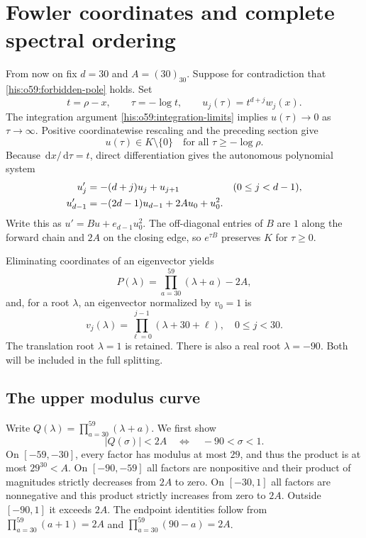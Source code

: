 \documentclass[11pt]{article}
\theoremstyle{remark}\newtheorem{remark}[theorem]{Remark}
\newcommand{\dd}{\,\mathrm d}
\numberwithin{equation}{section}
\begin{document}
\section{Fowler coordinates and complete spectral ordering}\label{his:o59:sec:fowler}
From now on fix $d=30$ and $A=(30)_{30}$. Suppose for contradiction
that \eqref{his:o59:forbidden-pole} holds. Set
\begin{equation}\label{his:o59:fowler}
t=\rho-x,\qquad \tau=-\log t,\qquad u_j(\tau)=t^{d+j}w_j(x).
\end{equation}
The integration argument \eqref{his:o59:integration-limits} implies
$u(\tau)\to0$ as $\tau\to\infty$. Positive coordinatewise rescaling
and the preceding section give
\begin{equation}\label{his:o59:orbit-properties}
u(\tau)\in K\setminus\{0\}\quad\text{for all }\tau\ge-\log\rho.
\end{equation}
Because $\dd x/\dd\tau=t$, direct differentiation gives the autonomous
polynomial system
\begin{align}
u_j'&=-(d+j)u_j+u_{j+1} &&(0\le j<d-1),\label{his:o59:fowler-system}\\
u_{d-1}'&=-(2d-1)u_{d-1}+2Au_0+u_0^2.\notag
\end{align}
Write this as $u'=Bu+e_{d-1}u_0^2$. The off-diagonal entries of $B$
are $1$ along the forward chain and $2A$ on the closing edge, so
$e^{\tau B}$ preserves $K$ for $\tau\ge0$.

Eliminating coordinates of an eigenvector yields
\begin{equation}\label{his:o59:characteristic}
P(\lambda)=\prod_{a=30}^{59}(\lambda+a)-2A,
\end{equation}
and, for a root $\lambda$, an eigenvector normalized by $v_0=1$ is
\begin{equation}\label{his:o59:eigenvector}
v_j(\lambda)=\prod_{\ell=0}^{j-1}(\lambda+30+\ell),
\quad 0\le j<30.
\end{equation}
The translation root $\lambda=1$ is retained. There is also a real
root $\lambda=-90$. Both will be included in the full splitting.

\subsection{The upper modulus curve}
Write $Q(\lambda)=\prod_{a=30}^{59}(\lambda+a)$. We first show
\begin{equation}\label{his:o59:real-modulus}
|Q(\sigma)|<2A\quad\Longleftrightarrow\quad -90<\sigma<1.
\end{equation}
On $[-59,-30]$, every factor has modulus at most $29$, and thus the
product is at most $29^{30}<A$. On $[-90,-59]$ all factors are
nonpositive and their product of magnitudes strictly decreases from
$2A$ to zero. On $[-30,1]$ all factors are nonnegative and this product
strictly increases from zero to $2A$. Outside $[-90,1]$ it exceeds
$2A$. The endpoint identities follow from
$\prod_{a=30}^{59}(a+1)=2A$ and
$\prod_{a=30}^{59}(90-a)=2A$.
\end{document}
